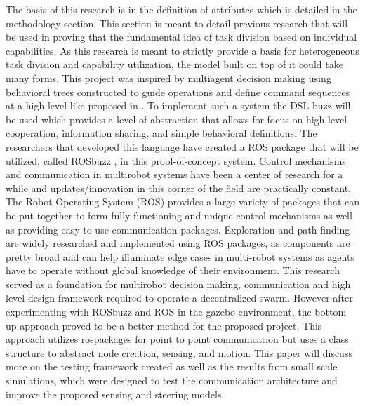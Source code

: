 The basis of this research is in the definition of attributes which is detailed
in the methodology section. This section is meant to detail previous research
that will be used in proving that the fundamental idea of task division based
on individual capabilities. As this research is meant to strictly provide a basis
for heterogeneous task division and capability utilization, the model built on
top of it could take many forms. This project was inspired by multiagent decision making
using behavioral trees constructed to guide operations and define command sequences at a high level like
proposed in \cite{beh-tree}. To implement such a
system the DSL buzz will be used which provides a level of abstraction that
allows for focus on high level cooperation, information sharing, and simple
behavioral definitions. The researchers that developed this language have created a
ROS package that will be utilized, called ROSbuzz \cite{rosbuzz}, in this proof-of-concept system.
Control mechanisms and communication in multirobot systems have been a center of
research for a while and updates/innovation in this corner of the field are practically
constant. The Robot Operating System (ROS) \cite{ROS} provides a large variety of packages
that can be put together to form fully functioning and unique control mechanisms as
well as providing easy to use communication packages. Exploration and path finding
are widely researched and implemented using ROS packages, as components are pretty
broad and can help illuminate edge cases in multi-robot systems as agents have to
operate without global knowledge of their environment. This research served as a
foundation for multirobot decision making, communication and high level design framework
required to operate a decentralized swarm. However after experimenting with ROSbuzz and ROS
in the gazebo environment, the bottom up approach proved to be a better method for the proposed
project. This approach utilizes rospackages for point to point communication
but uses a class structure to abstract node creation, sensing, and motion. This paper
will discuss more on the testing framework created as well as the results from small
scale simulations, which were designed to test the communication
architecture and improve the proposed sensing and steering models.
